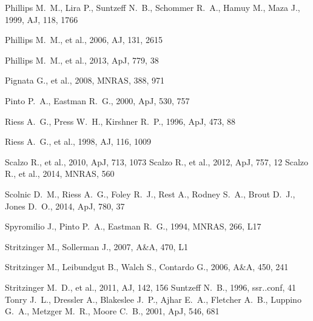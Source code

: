 \begin{thebibliography}{99}
 Phillips M.~M., Lira P., Suntzeff N.~B., 
Schommer R.~A., Hamuy M., Maza J., 1999, AJ, 118, 1766 

 Phillips M.~M., et al., 2006, AJ, 131, 
2615 

 Phillips M.~M., et al., 2013, ApJ, 779, 38 

 Pignata G., et al., 2008, MNRAS, 388, 971 

 Pinto P.~A., Eastman R.~G., 2000, ApJ, 530, 757 

 Riess A.~G., Press W.~H., Kirshner R.~P., 1996, ApJ, 473, 88 

Riess A.~G., et al., 1998, AJ, 116, 1009 

Scalzo R., et al., 2010, ApJ, 713, 1073 
Scalzo R., et al., 2012, ApJ, 757, 12 
Scalzo R., et al., 2014, MNRAS, 560 





 Scolnic D.~M., Riess A.~G., Foley R.~J., 
Rest A., Rodney S.~A., Brout D.~J., Jones D.~O., 2014, ApJ, 780, 37 

 Spyromilio J., Pinto P.~A., Eastman R.~G., 1994, MNRAS, 266, L17 

 Stritzinger M., Sollerman J.,
2007, A\&A, 470, L1 

 Stritzinger M., Leibundgut B., Walch S.,
Contardo G., 2006, A\&A, 450, 241 

 Stritzinger M.~D., et al., 2011, AJ, 142, 
156 
Suntzeff N.~B., 1996, ssr..conf, 41 
Tonry J.~L., Dressler A., Blakeslee J.~P., Ajhar E.~A., Fletcher A.~B., 
Luppino G.~A., Metzger M.~R., Moore C.~B., 2001, ApJ, 546, 681


\end{thebibliography}
